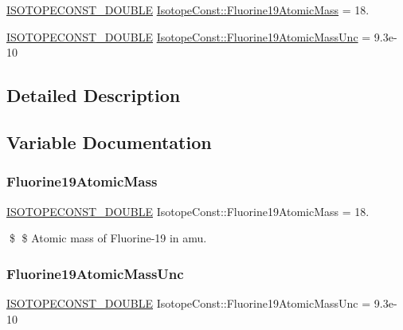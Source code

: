 \begin{DoxyCompactItemize}
\item 
\mbox{\hyperlink{group___isotope_const-_macros_ga8f45a7272ce02c0b4c65c44636ed719a}{I\+S\+O\+T\+O\+P\+E\+C\+O\+N\+S\+T\+\_\+\+D\+O\+U\+B\+LE}} \mbox{\hyperlink{group___isotope_const-_fluorine-_f19_gaa246deaa55f021c5e4e378ad1c15a920}{Isotope\+Const\+::\+Fluorine19\+Atomic\+Mass}} = 18.
\item 
\mbox{\hyperlink{group___isotope_const-_macros_ga8f45a7272ce02c0b4c65c44636ed719a}{I\+S\+O\+T\+O\+P\+E\+C\+O\+N\+S\+T\+\_\+\+D\+O\+U\+B\+LE}} \mbox{\hyperlink{group___isotope_const-_fluorine-_f19_ga3bb67577e7b8441d7d6ec910d4f2bcf5}{Isotope\+Const\+::\+Fluorine19\+Atomic\+Mass\+Unc}} = 9.\+3e-\/10
\end{DoxyCompactItemize}


\subsection{Detailed Description}


\subsection{Variable Documentation}
\mbox{\label{group___isotope_const-_fluorine-_f19_gaa246deaa55f021c5e4e378ad1c15a920}} 
\subsubsection{\texorpdfstring{Fluorine19\+Atomic\+Mass}{Fluorine19AtomicMass}}
{\footnotesize\ttfamily \mbox{\hyperlink{group___isotope_const-_macros_ga8f45a7272ce02c0b4c65c44636ed719a}{I\+S\+O\+T\+O\+P\+E\+C\+O\+N\+S\+T\+\_\+\+D\+O\+U\+B\+LE}} Isotope\+Const\+::\+Fluorine19\+Atomic\+Mass = 18.}

\$ \$ Atomic mass of Fluorine-\/19 in amu. \mbox{\label{group___isotope_const-_fluorine-_f19_ga3bb67577e7b8441d7d6ec910d4f2bcf5}} 
\subsubsection{\texorpdfstring{Fluorine19\+Atomic\+Mass\+Unc}{Fluorine19AtomicMassUnc}}
{\footnotesize\ttfamily \mbox{\hyperlink{group___isotope_const-_macros_ga8f45a7272ce02c0b4c65c44636ed719a}{I\+S\+O\+T\+O\+P\+E\+C\+O\+N\+S\+T\+\_\+\+D\+O\+U\+B\+LE}} Isotope\+Const\+::\+Fluorine19\+Atomic\+Mass\+Unc = 9.\+3e-\/10}


